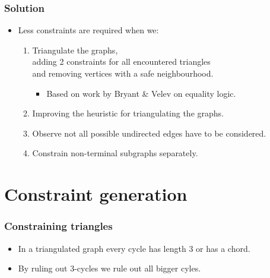 \documentclass{beamer}
\begin{document}
\begin{frame}
    \frametitle{Solution}
    \begin{itemize}
        \item Less constraints are required when we:
        \begin{enumerate}
            \item Triangulate the graphs,\\
                    adding 2 constraints for all encountered triangles\\
                    and removing vertices with a safe neighbourhood.
            \begin{itemize}
                \item Based on work by Bryant \& Velev on equality logic.
            \end{itemize}
            \item Improving the heuristic for triangulating the graphs.
            \item Observe not all possible undirected edges have to be considered.
            \item Constrain non-terminal subgraphs separately.
        \end{enumerate}
    \end{itemize}
\end{frame}

\section{Constraint generation}
\begin{frame}
    \frametitle{Constraining triangles}
    \begin{itemize}
        \item In a triangulated graph every cycle has length 3 or has a chord.
        \item By ruling out 3-cycles we rule out all bigger cyles.
    \end{itemize}
    \begin{figure}
    \end{figure}
\end{frame}
\end{document}
